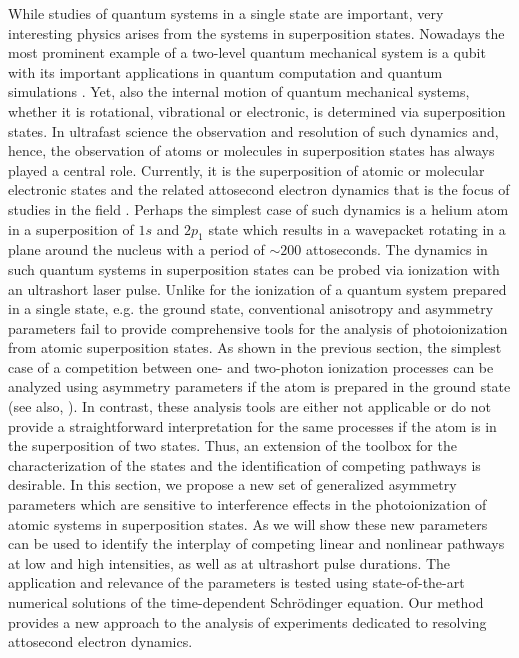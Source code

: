 While studies of quantum systems in a single state are important, very interesting physics arises from the systems in superposition states. Nowadays the most prominent example of a two-level quantum mechanical system is a qubit with its important applications in quantum computation and quantum simulations \cite{saffman2016}. Yet, also the internal motion of quantum mechanical systems, whether it is rotational, vibrational or electronic, is determined via superposition states. In ultrafast science the observation and resolution of such dynamics and, hence, the observation of atoms or molecules in superposition states has always played a central role. Currently, it is the superposition of atomic or molecular electronic states and the related attosecond electron dynamics that is the focus of studies in the field \cite{goulielmakis2010,mauritsson2010,holler2011,xie2012}. Perhaps the simplest case of such dynamics is a helium atom in a superposition of $1s$ and $2p_1$ state which results in a wavepacket rotating in a plane around the nucleus with a period of $\sim200$ attoseconds. The dynamics in such quantum systems in superposition states can be probed via ionization with an ultrashort laser pulse. Unlike for the ionization of a quantum system prepared in a single state, e.g. the ground state, conventional anisotropy and asymmetry parameters fail to provide comprehensive tools for the analysis of photoionization from atomic superposition states. As shown in the previous section, the simplest case of a competition between one- and two-photon ionization processes can be analyzed using asymmetry parameters if the atom is prepared in the ground state (see also,  \cite{ishikawa2012,ma2013,grum-grzhimailo2015,douguet2016,hofbrucker2018,boll2019,wang2019,venzke2020_ionization}). In contrast, these analysis tools are either not applicable or do not provide a straightforward interpretation for the same processes if the atom is in the superposition of two states. Thus, an extension of the toolbox for the characterization of the states and the identification of competing pathways is desirable. In this section, we propose a new set of generalized asymmetry parameters which are sensitive to interference effects in the photoionization of atomic systems in superposition states. As we will show these new parameters can be used to identify the interplay of competing linear and nonlinear pathways at low and high intensities, as well as at ultrashort pulse durations. The application and relevance of the parameters is tested using state-of-the-art numerical solutions of the time-dependent Schr\"odinger equation. Our method provides a new approach to the analysis of experiments dedicated to resolving attosecond electron dynamics.



